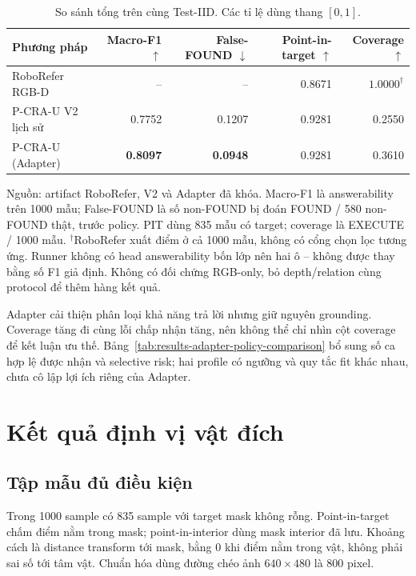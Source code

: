 \begin{table}[htbp]
    \centering
    \setlength{\tabcolsep}{4pt}
    \renewcommand{\arraystretch}{1.15}
    \caption{So sánh tổng trên cùng Test-IID. Các tỉ lệ dùng thang $[0,1]$.}
    \label{tab:results-overall-comparison}
    \small
    \begin{tabularx}{\textwidth}{@{}>{\raggedright\arraybackslash}Xrrrr@{}}
        \toprule
        Phương pháp & Macro-F1 $\uparrow$ & False-FOUND $\downarrow$ &
        Point-in-target $\uparrow$ & Coverage $\uparrow$ \\
        \midrule
        RoboRefer RGB-D & -- & -- & 0.8671 & $1.0000^{\dagger}$ \\
        P-CRA-U V2 lịch sử & 0.7752 & 0.1207 & 0.9281 & 0.2550 \\
        P-CRA-U (Adapter) & \textbf{0.8097} & \textbf{0.0948} & 0.9281 & 0.3610 \\
        \bottomrule
    \end{tabularx}
    {\footnotesize\raggedright Nguồn: artifact RoboRefer, V2 và Adapter đã khóa.
    Macro-F1 là answerability trên 1000 mẫu; False-FOUND là
    số non-FOUND bị đoán FOUND / 580 non-FOUND thật, trước policy.
    PIT dùng 835 mẫu có target; coverage là EXECUTE / 1000 mẫu.
    $^{\dagger}$RoboRefer xuất điểm ở cả 1000 mẫu, không có cổng chọn lọc
    tương ứng. Runner không có head answerability bốn lớp nên hai ô --
    không được thay bằng số F1 giả định. Không có đối chứng RGB-only,
    bỏ depth/relation cùng protocol để thêm hàng kết quả.\par}
\end{table}

Adapter cải thiện phân loại khả năng trả lời nhưng giữ nguyên grounding.
Coverage tăng đi cùng lỗi chấp nhận tăng, nên không thể chỉ nhìn cột
coverage để kết luận ưu thế. Bảng~\ref{tab:results-adapter-policy-comparison}
bổ sung số ca hợp lệ được nhận và selective risk; hai profile có ngưỡng
và quy tắc fit khác nhau, chưa cô lập lợi ích riêng của Adapter.

\section{Kết quả định vị vật đích}
\label{sec:results-grounding}

\subsection{Tập mẫu đủ điều kiện}

Trong 1000 sample có 835 sample với target mask không rỗng.
Point-in-target chấm điểm nằm trong mask; point-in-interior
dùng mask interior đã lưu. Khoảng cách là distance transform
tới mask, bằng 0 khi điểm nằm trong vật, không phải sai số
tới tâm vật. Chuẩn hóa dùng đường chéo ảnh $640\times480$
là 800 pixel.

